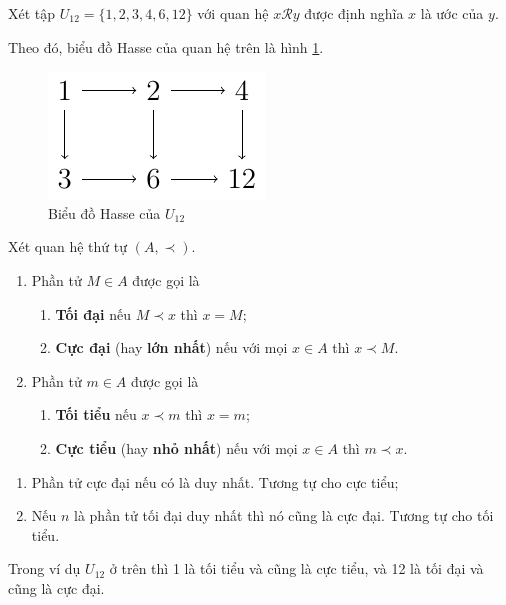 \begin{example}
    Xét tập $U_{12} = \{ 1, 2, 3, 4, 6, 12 \}$ với quan hệ $x \mathcal{R} y$ được định nghĩa $x$ là ước của $y$.

    Theo đó, biểu đồ Hasse của quan hệ trên là hình \ref{hasse:1}.
    \begin{figure}[ht]
        \centering
        \includegraphics{figures/hasse/hasse1.pdf}
        \caption{Biểu đồ Hasse của $U_{12}$}
        \label{hasse:1}
    \end{figure}
\end{example}

\begin{definition}
    Xét quan hệ thứ tự $(A, \prec)$.
    \begin{enumerate}
        \item Phần tử $M \in A$ được gọi là
        \begin{enumerate}
            \item \textbf{Tối đại} nếu $M \prec x$ thì $x = M$;
            \item \textbf{Cực đại} (hay \textbf{lớn nhất}) nếu với mọi $x \in A$ thì $x \prec M$.
        \end{enumerate}
        \item Phần tử $m \in A$ được gọi là
        \begin{enumerate}
            \item \textbf{Tối tiểu} nếu $x \prec m$ thì $x = m$;
            \item \textbf{Cực tiểu} (hay \textbf{nhỏ nhất}) nếu với mọi $x \in A$ thì $m \prec x$.
        \end{enumerate}
    \end{enumerate}
\end{definition}

\begin{remark}
    \begin{enumerate}
        \item Phần tử cực đại nếu có là duy nhất. Tương tự cho cực tiểu;
        \item Nếu $n$ là phần tử tối đại duy nhất thì nó cũng là cực đại. Tương tự cho tối tiểu.
    \end{enumerate}
\end{remark}

Trong ví dụ $U_{12}$ ở trên thì 1 là tối tiểu và cũng là cực tiểu, và 12 là tối đại và cũng là cực đại.
